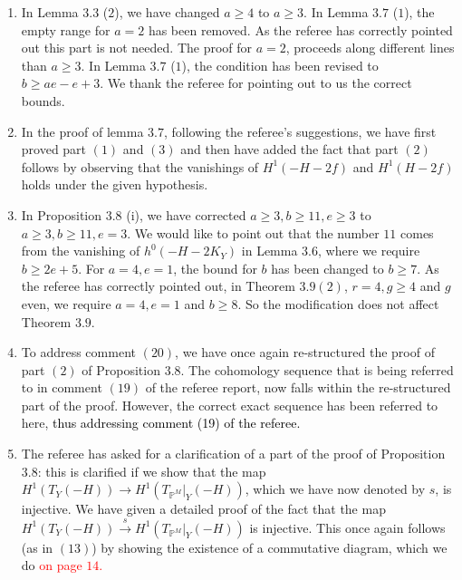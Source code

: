 \documentclass[11pt,twoside]{amsart}
\theoremstyle{plain}
\numberwithin{equation}{section}
\theoremstyle{definition}
\begin{document}
\begin{enumerate}
\item[$(16)$] In Lemma $3.3$ ($2$), we have changed $a \geq 4$ to $a \geq 3$. In Lemma $3.7$ ($1$), the empty range for $a = 2$ has been removed. As the referee has correctly pointed out this part is not needed. The proof for $a = 2$, proceeds along different lines than $a \geq 3$. In Lemma $3.7$ ($1$), the condition has been revised to $b \geq ae-e+3$. We thank the referee for pointing out to us the correct bounds. 
 
\item[$(17)$] In the proof of lemma $3.7$, following the referee's suggestions, we have first proved part $(1)$ and $(3)$ and then have added the fact that part $(2)$ follows by observing that the vanishings of $H^1(-H-2f)$ and $H^1(H-2f)$ holds under the given hypothesis.   

\item[$(18)$] In Proposition $3.8$ (i), we have corrected $a \geq 3, b \geq 11, e \geq 3$ to $a \geq 3, b \geq 11, e = 3$. We would like to point out that the number $11$ comes from the vanishing of $h^0(-H-2K_Y)$ in Lemma $3.6$, where we require $b \geq 2e+5$. For $a = 4, e = 1$, the bound for $b$ has been changed to $b \geq 7$. As the referee has correctly pointed out, in Theorem $3.9(2)$, $r = 4, g \geq 4$ and $g$ even, we require $a = 4, e = 1$ and $b \geq 8$. So the modification does not affect Theorem $3.9$.

\item[$(19)$] To address comment $(20)$, we have once again re-structured the proof of part $(2)$ of Proposition $3.8$.  The cohomology sequence that is being referred to in comment $(19)$ of the referee report, now falls within the re-structured part of the proof. However, the correct exact sequence has been referred to here, \textcolor{black}{thus addressing comment (19) of the referee.}
 
 
\item[$(20)$] The referee has asked for a clarification of a part of the proof of Proposition $3.8$: this is clarified if we show that the map $H^1(T_Y(-H)) \xrightarrow{}  H^1(T_{\mathbb{P}^M}|_Y(-H))$, which we have now denoted by $s$, is injective. We have given a detailed proof of the fact that the map $H^1(T_Y(-H)) \xrightarrow{s}  H^1(T_{\mathbb{P}^M}|_Y(-H))$ is injective. This once again follows (as in $(13)$) by showing the existence of a commutative diagram, which we do \textcolor{red}{on page $14$.} 


\end{enumerate}
\end{document}
